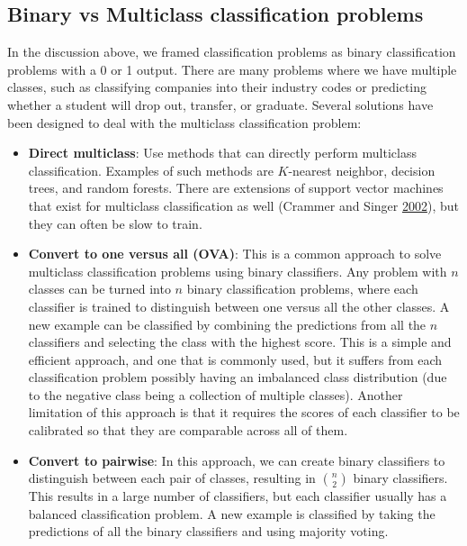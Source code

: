 \documentclass[]{krantz}
\begin{document}
\subsection{Binary vs Multiclass classification
problems}\label{binary-vs-multiclass-classification-problems}

In the discussion above, we framed classification problems as binary
classification problems with a 0 or 1 output. There are many problems
where we have multiple classes, such as classifying companies into their
industry codes or predicting whether a student will drop out, transfer,
or graduate. Several solutions have been designed to deal with the
multiclass classification problem:

\begin{itemize}
\item
  \textbf{Direct multiclass}: Use methods that can directly perform
  multiclass classification. Examples of such methods are \(K\)-nearest
  neighbor, decision trees, and random forests. There are extensions of
  support vector machines that exist for multiclass classification as
  well (Crammer and Singer \protect\hyperlink{ref-crammer2002}{2002}),
  but they can often be slow to train.
\item
  \textbf{Convert to one versus all (OVA)}: This is a common approach to
  solve multiclass classification problems using binary classifiers. Any
  problem with \(n\) classes can be turned into \(n\) binary
  classification problems, where each classifier is trained to
  distinguish between one versus all the other classes. A new example
  can be classified by combining the predictions from all the \(n\)
  classifiers and selecting the class with the highest score. This is a
  simple and efficient approach, and one that is commonly used, but it
  suffers from each classification problem possibly having an imbalanced
  class distribution (due to the negative class being a collection of
  multiple classes). Another limitation of this approach is that it
  requires the scores of each classifier to be calibrated so that they
  are comparable across all of them.
\item
  \textbf{Convert to pairwise}: In this approach, we can create binary
  classifiers to distinguish between each pair of classes, resulting in
  \(\binom{n}{2}\) binary classifiers. This results in a large number of
  classifiers, but each classifier usually has a balanced classification
  problem. A new example is classified by taking the predictions of all
  the binary classifiers and using majority voting.
\end{itemize}
\end{document}
